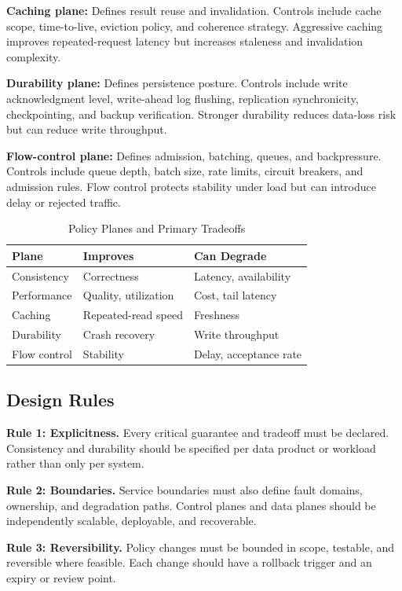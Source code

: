 \documentclass[conference]{IEEEtran}
\begin{document}
\textbf{Caching plane:} Defines result reuse and invalidation. Controls include cache scope, time-to-live, eviction policy, and coherence strategy. Aggressive caching improves repeated-request latency but increases staleness and invalidation complexity.

\textbf{Durability plane:} Defines persistence posture. Controls include write acknowledgment level, write-ahead log flushing, replication synchronicity, checkpointing, and backup verification. Stronger durability reduces data-loss risk but can reduce write throughput.

\textbf{Flow-control plane:} Defines admission, batching, queues, and backpressure. Controls include queue depth, batch size, rate limits, circuit breakers, and admission rules. Flow control protects stability under load but can introduce delay or rejected traffic.

\begin{table}[t]
\caption{Policy Planes and Primary Tradeoffs}
\label{tab:planes}
\centering
\small
\begin{tabular}{@{}l l l@{}}
\toprule
\textbf{Plane} & \textbf{Improves} & \textbf{Can Degrade} \\
\midrule
Consistency & Correctness & Latency, availability \\
Performance & Quality, utilization & Cost, tail latency \\
Caching & Repeated-read speed & Freshness \\
Durability & Crash recovery & Write throughput \\
Flow control & Stability & Delay, acceptance rate \\
\bottomrule
\end{tabular}
\end{table}

\subsection{Design Rules}

\textbf{Rule 1: Explicitness.} Every critical guarantee and tradeoff must be declared. Consistency and durability should be specified per data product or workload rather than only per system.

\textbf{Rule 2: Boundaries.} Service boundaries must also define fault domains, ownership, and degradation paths. Control planes and data planes should be independently scalable, deployable, and recoverable.

\textbf{Rule 3: Reversibility.} Policy changes must be bounded in scope, testable, and reversible where feasible. Each change should have a rollback trigger and an expiry or review point.
\end{document}
